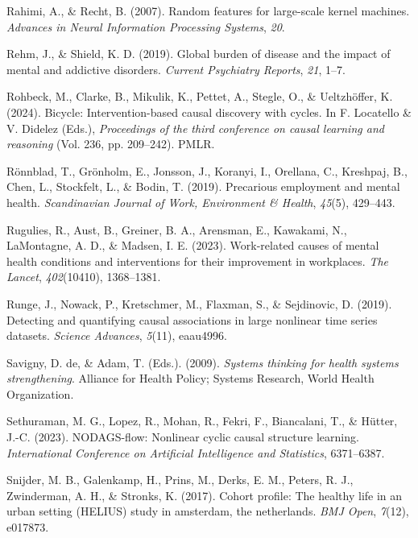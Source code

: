 \documentclass[
]{article}
\newlength{\cslhangindent}
\newenvironment{CSLReferences}[2] %
 {\begin{list}{}{%
  \setlength{\itemindent}{0pt}
  \setlength{\leftmargin}{0pt}
  \setlength{\parsep}{0pt}
  \ifodd #1
   \setlength{\leftmargin}{\cslhangindent}
   \setlength{\itemindent}{-1\cslhangindent}
  \fi
  \setlength{\itemsep}{#2\baselineskip}}}
 {\end{list}}
\begin{document}
\begin{CSLReferences}{1}{0}
Rahimi, A., \& Recht, B. (2007). Random features for large-scale kernel
machines. \emph{Advances in Neural Information Processing Systems},
\emph{20}.

Rehm, J., \& Shield, K. D. (2019). Global burden of disease and the
impact of mental and addictive disorders. \emph{Current Psychiatry
Reports}, \emph{21}, 1--7.

Rohbeck, M., Clarke, B., Mikulik, K., Pettet, A., Stegle, O., \&
Ueltzhöffer, K. (2024). Bicycle: Intervention-based causal discovery
with cycles. In F. Locatello \& V. Didelez (Eds.), \emph{Proceedings of
the third conference on causal learning and reasoning} (Vol. 236, pp.
209--242). PMLR.

Rönnblad, T., Grönholm, E., Jonsson, J., Koranyi, I., Orellana, C.,
Kreshpaj, B., Chen, L., Stockfelt, L., \& Bodin, T. (2019). Precarious
employment and mental health. \emph{Scandinavian Journal of Work,
Environment \& Health}, \emph{45}(5), 429--443.

Rugulies, R., Aust, B., Greiner, B. A., Arensman, E., Kawakami, N.,
LaMontagne, A. D., \& Madsen, I. E. (2023). Work-related causes of
mental health conditions and interventions for their improvement in
workplaces. \emph{The Lancet}, \emph{402}(10410), 1368--1381.

Runge, J., Nowack, P., Kretschmer, M., Flaxman, S., \& Sejdinovic, D.
(2019). Detecting and quantifying causal associations in large nonlinear
time series datasets. \emph{Science Advances}, \emph{5}(11), eaau4996.

Savigny, D. de, \& Adam, T. (Eds.). (2009). \emph{Systems thinking for
health systems strengthening}. Alliance for Health Policy; Systems
Research, World Health Organization.

Sethuraman, M. G., Lopez, R., Mohan, R., Fekri, F., Biancalani, T., \&
Hütter, J.-C. (2023). NODAGS-flow: Nonlinear cyclic causal structure
learning. \emph{International Conference on Artificial Intelligence and
Statistics}, 6371--6387.

Snijder, M. B., Galenkamp, H., Prins, M., Derks, E. M., Peters, R. J.,
Zwinderman, A. H., \& Stronks, K. (2017). Cohort profile: The healthy
life in an urban setting (HELIUS) study in amsterdam, the netherlands.
\emph{BMJ Open}, \emph{7}(12), e017873.


\end{CSLReferences}
\end{document}
